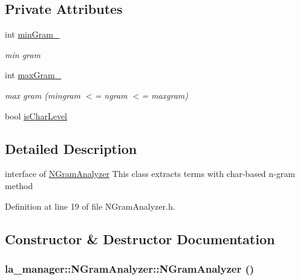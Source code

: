 \subsection*{Private Attributes}
\begin{CompactItemize}
\item 
int \hyperlink{classla__manager_1_1NGramAnalyzer_d126ddf018bf01f6438fcdb016617dfa}{minGram\_\-}
\begin{CompactList}\small\item\em min gram \item\end{CompactList}\item 
int \hyperlink{classla__manager_1_1NGramAnalyzer_1e26dc15f529448357b98b716c3d38a8}{maxGram\_\-}
\begin{CompactList}\small\item\em max gram (mingram $<$= ngram $<$= maxgram) \item\end{CompactList}\item 
bool \hyperlink{classla__manager_1_1NGramAnalyzer_658ed8026b730416d1cf6729ae0deb11}{isCharLevel}
\end{CompactItemize}


\subsection{Detailed Description}
interface of \hyperlink{classla__manager_1_1NGramAnalyzer}{NGramAnalyzer} This class extracts terms with char-based n-gram method 

Definition at line 19 of file NGramAnalyzer.h.

\subsection{Constructor \& Destructor Documentation}
\hypertarget{classla__manager_1_1NGramAnalyzer_05e6b652c06667bb8a860c710bc438c6}{
\subsubsection[{NGramAnalyzer}]{\setlength{\rightskip}{0pt plus 5cm}la\_\-manager::NGramAnalyzer::NGramAnalyzer ()}}
\label{classla__manager_1_1NGramAnalyzer_05e6b652c06667bb8a860c710bc438c6}





